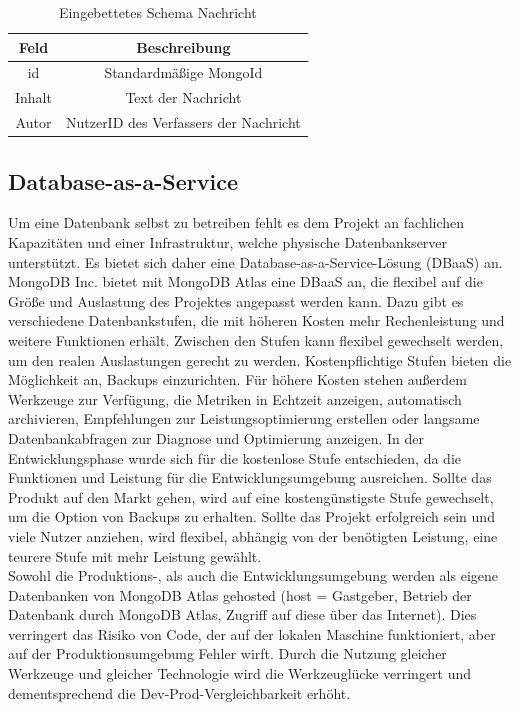 \begin{table}
    \centering
    \begin{tabular}{ |c|c| }
        \hline
        Feld & Beschreibung  \\
        \hline
        id & Standardmäßige MongoId \\
        Inhalt & Text der Nachricht \\
        Autor & NutzerID des Verfassers der Nachricht \\
        \hline
    \end{tabular}
    \caption{Eingebettetes Schema Nachricht}
    \label{db:table:nachricht}
\end{table}

\subsection{Database-as-a-Service}
Um eine Datenbank selbst zu betreiben fehlt es dem Projekt an fachlichen Kapazitäten und einer Infrastruktur, welche physische Datenbankserver unterstützt.
Es bietet sich daher eine Database-as-a-Service-Lösung (DBaaS) an.\\ 
MongoDB Inc. bietet mit MongoDB Atlas eine DBaaS an, die flexibel auf die Größe und Auslastung des Projektes angepasst werden kann.
Dazu gibt es verschiedene Datenbankstufen, die mit höheren Kosten mehr Rechenleistung und weitere Funktionen erhält.
Zwischen den Stufen kann flexibel gewechselt werden, um den realen Auslastungen gerecht zu werden.
Kostenpflichtige Stufen bieten die Möglichkeit an, Backups einzurichten.
Für höhere Kosten stehen außerdem Werkzeuge zur Verfügung, die Metriken in Echtzeit anzeigen, automatisch archivieren, Empfehlungen zur Leistungsoptimierung erstellen oder langsame Datenbankabfragen zur Diagnose und Optimierung anzeigen.
In der Entwicklungsphase wurde sich für die kostenlose Stufe entschieden, da die Funktionen und Leistung für die Entwicklungsumgebung ausreichen.
Sollte das Produkt auf den Markt gehen, wird auf eine kostengünstigste Stufe gewechselt, um die Option von Backups zu erhalten.
Sollte das Projekt erfolgreich sein und viele Nutzer anziehen, wird flexibel, abhängig von der benötigten Leistung, eine teurere Stufe mit mehr Leistung gewählt.\\
Sowohl die Produktions-, als auch die Entwicklungsumgebung werden als eigene Datenbanken von MongoDB Atlas gehosted (host = Gastgeber, Betrieb der Datenbank durch MongoDB Atlas, Zugriff auf diese über das Internet).
Dies verringert das Risiko von Code, der auf der lokalen Maschine funktioniert, aber auf der Produktionsumgebung Fehler wirft.
Durch die Nutzung gleicher Werkzeuge und gleicher Technologie wird die Werkzeuglücke verringert und dementsprechend die Dev-Prod-Vergleichbarkeit erhöht. \cite{db:devProdParity}

